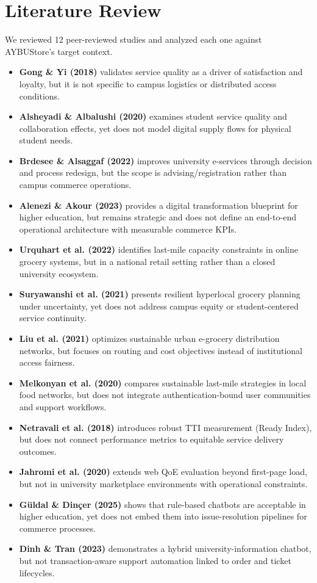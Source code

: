 \documentclass[11pt,a4paper]{article}
\begin{document}
\section{Literature Review}
We reviewed 12 peer-reviewed studies and analyzed each one against AYBUStore's target context.
\begin{itemize}
    \item \textbf{Gong \& Yi (2018)} validates service quality as a driver of satisfaction and loyalty, but it is not specific to campus logistics or distributed access conditions.
    \item \textbf{Alsheyadi \& Albalushi (2020)} examines student service quality and collaboration effects, yet does not model digital supply flows for physical student needs.
    \item \textbf{Brdesee \& Alsaggaf (2022)} improves university e-services through decision and process redesign, but the scope is advising/registration rather than campus commerce operations.
    \item \textbf{Alenezi \& Akour (2023)} provides a digital transformation blueprint for higher education, but remains strategic and does not define an end-to-end operational architecture with measurable commerce KPIs.
    \item \textbf{Urquhart et al. (2022)} identifies last-mile capacity constraints in online grocery systems, but in a national retail setting rather than a closed university ecosystem.
    \item \textbf{Suryawanshi et al. (2021)} presents resilient hyperlocal grocery planning under uncertainty, yet does not address campus equity or student-centered service continuity.
    \item \textbf{Liu et al. (2021)} optimizes sustainable urban e-grocery distribution networks, but focuses on routing and cost objectives instead of institutional access fairness.
    \item \textbf{Melkonyan et al. (2020)} compares sustainable last-mile strategies in local food networks, but does not integrate authentication-bound user communities and support workflows.
    \item \textbf{Netravali et al. (2018)} introduces robust TTI measurement (Ready Index), but does not connect performance metrics to equitable service delivery outcomes.
    \item \textbf{Jahromi et al. (2020)} extends web QoE evaluation beyond first-page load, but not in university marketplace environments with operational constraints.
    \item \textbf{Güldal \& Dinçer (2025)} shows that rule-based chatbots are acceptable in higher education, yet does not embed them into issue-resolution pipelines for commerce processes.
    \item \textbf{Dinh \& Tran (2023)} demonstrates a hybrid university-information chatbot, but not transaction-aware support automation linked to order and ticket lifecycles.
\end{itemize}
 
\end{document}
